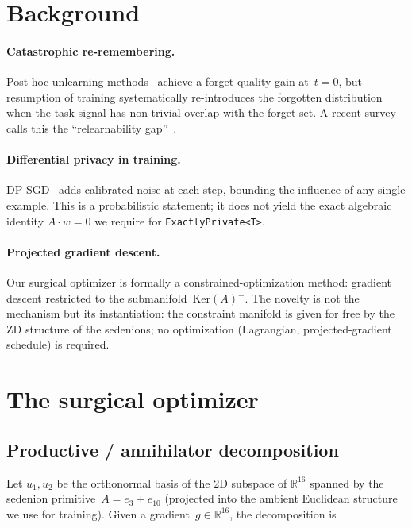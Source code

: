 \documentclass{article}
\begin{document}
\section{Background}

\paragraph{Catastrophic re-remembering.}
Post-hoc unlearning methods~\cite{ginart2019making,bourtoule2021machine}
achieve a forget-quality gain at~$t=0$, but resumption of training
systematically re-introduces the forgotten distribution when the
task signal has non-trivial overlap with the forget set.  A recent
survey calls this the ``relearnability gap''~\cite{muse2024,liu2024rethinking}.

\paragraph{Differential privacy in training.}
DP-SGD~\cite{abadi2016deep} adds calibrated noise at each step,
bounding the influence of any single example.  This is a
probabilistic statement; it does not yield the exact algebraic
identity $A \cdot w = 0$ we require for \texttt{ExactlyPrivate<T>}.

\paragraph{Projected gradient descent.}
Our surgical optimizer is formally a constrained-optimization method:
gradient descent restricted to the submanifold~$\mathrm{Ker}(A)^\perp$.
The novelty is not the mechanism but its instantiation: the
constraint manifold is given for free by the ZD structure of the
sedenions; no optimization (Lagrangian, projected-gradient schedule)
is required.

\section{The surgical optimizer}
\label{sec:optimizer}

\subsection{Productive / annihilator decomposition}

Let $u_1, u_2$ be the orthonormal basis of the 2D subspace of
$\mathbb R^{16}$ spanned by the sedenion primitive~$A = e_3 + e_{10}$
(projected into the ambient Euclidean structure we use for training).
Given a gradient~$g \in \mathbb R^{16}$, the decomposition is
\end{document}
